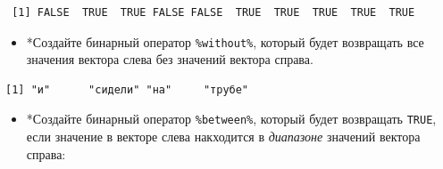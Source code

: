 \documentclass[
]{book}
\newenvironment{Shaded}{\begin{snugshade}}{\end{snugshade}}
\newcommand{\ControlFlowTok}[1]{\textcolor[rgb]{0.13,0.29,0.53}{\textbf{#1}}}
\newcommand{\DataTypeTok}[1]{\textcolor[rgb]{0.13,0.29,0.53}{#1}}
\newcommand{\KeywordTok}[1]{\textcolor[rgb]{0.13,0.29,0.53}{\textbf{#1}}}
\newcommand{\NormalTok}[1]{#1}
\newcommand{\OperatorTok}[1]{\textcolor[rgb]{0.81,0.36,0.00}{\textbf{#1}}}
\newcommand{\StringTok}[1]{\textcolor[rgb]{0.31,0.60,0.02}{#1}}
\providecommand{\tightlist}{%
  \setlength{\itemsep}{0pt}\setlength{\parskip}{0pt}}
\begin{document}
\begin{verbatim}
 [1] FALSE  TRUE  TRUE FALSE FALSE  TRUE  TRUE  TRUE  TRUE  TRUE
\end{verbatim}

\begin{itemize}
\tightlist
\item
  *Создайте бинарный оператор \texttt{\%without\%}, который будет возвращать все значения вектора слева без значений вектора справа.
\end{itemize}

\begin{Shaded}
\end{Shaded}

\begin{Shaded}
\end{Shaded}

\begin{verbatim}
[1] "и"      "сидели" "на"     "трубе" 
\end{verbatim}

\begin{itemize}
\tightlist
\item
  *Создайте бинарный оператор \texttt{\%between\%}, который будет возвращать \texttt{TRUE}, если значение в векторе слева накходится в \emph{диапазоне} значений вектора справа:
\end{itemize}

\begin{Shaded}
\end{Shaded}
\end{document}
